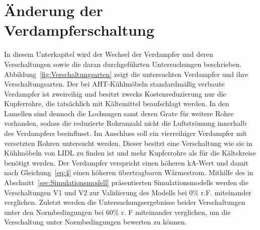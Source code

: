 \clearpage





\section{Änderung der Verdampferschaltung}
\label{sec:Änderung der Verdampferschaltung}

In diesem Unterkapitel wird der Wechsel der Verdampfer und deren Verschaltungen sowie die daran durchgeführten Untersuchungen beschrieben. Abbildung~\ref{fig:Verschaltungsarten} zeigt die untersuchten Verdampfer und ihre Verschaltungsarten. Der bei AHT-Kühlmöbeln standardmäßig verbaute Verdampfer ist zweireihig und besitzt zwecks Kostenreduzierung nur die Kupferrohre, die tatsächlich mit Kältemittel beaufschlagt werden. In den Lamellen sind dennoch die Lochungen samt deren Grate für weitere Rohre vorhanden, sodass die reduzierte Rohranzahl nicht die Luftströmung innerhalb des Verdampfers beeinflusst. Im Anschluss soll ein vierreihiger Verdampfer mit versetzten Rohren untersucht werden. Dieser besitzt eine Verschaltung wie sie in Kühlmöbeln von LIDL zu finden ist und mehr Kupferrohre als für die Kältekreise benötigt werden. Der Verdampfer verspricht einen höheren kA-Wert und damit nach Gleichung~\ref{eq:4} einen höheren übertragbaren Wärmestrom. Mithilfe des in Abschnitt~\ref{sec:Simulationsmodell} präsentierten Simulationsmodells werden die Verschaltungen V1 und V2 zur Validierung des Modells bei \unit{0}{\%} r.F.  miteinander verglichen. Zuletzt werden die Untersuchungsergebnisse beider Verschaltungen unter den Normbedingungen bei \unit{60}{\%} r. F miteinander verglichen, um die Verschaltung unter Normbedingungen bewerten zu können.

